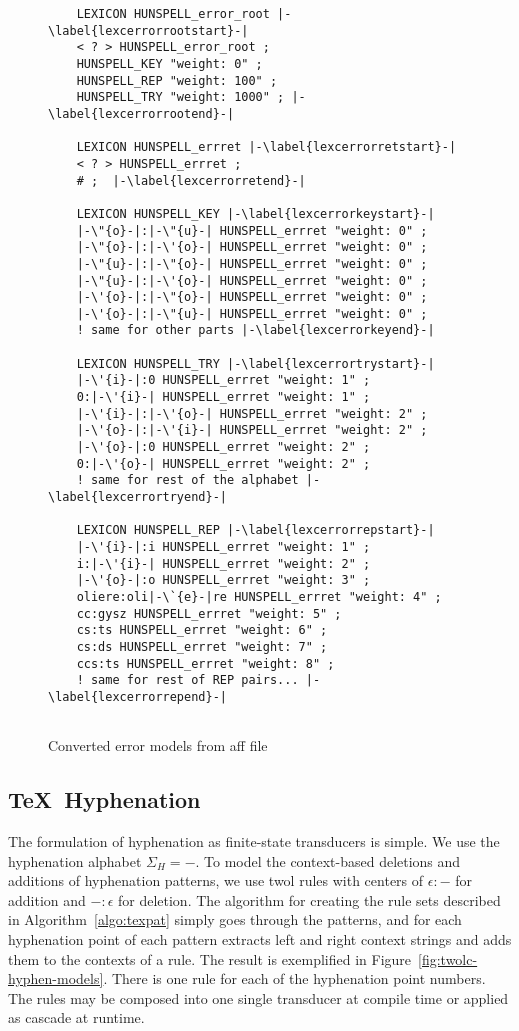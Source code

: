 \documentclass[postprint]{flammie}
\begin{document}
\begin{figure}[tbp]
  \centering
  \begin{lstlisting}
    LEXICON HUNSPELL_error_root |-\label{lexcerrorrootstart}-|
    < ? > HUNSPELL_error_root ; 
    HUNSPELL_KEY "weight: 0" ;
    HUNSPELL_REP "weight: 100" ;
    HUNSPELL_TRY "weight: 1000" ; |-\label{lexcerrorrootend}-|
    
    LEXICON HUNSPELL_errret |-\label{lexcerrorretstart}-|
    < ? > HUNSPELL_errret ; 
    # ;  |-\label{lexcerrorretend}-|
    
    LEXICON HUNSPELL_KEY |-\label{lexcerrorkeystart}-|
    |-\"{o}-|:|-\"{u}-| HUNSPELL_errret "weight: 0" ; 
    |-\"{o}-|:|-\'{o}-| HUNSPELL_errret "weight: 0" ;
    |-\"{u}-|:|-\"{o}-| HUNSPELL_errret "weight: 0" ;
    |-\"{u}-|:|-\'{o}-| HUNSPELL_errret "weight: 0" ;
    |-\'{o}-|:|-\"{o}-| HUNSPELL_errret "weight: 0" ;
    |-\'{o}-|:|-\"{u}-| HUNSPELL_errret "weight: 0" ; 
    ! same for other parts |-\label{lexcerrorkeyend}-|
    
    LEXICON HUNSPELL_TRY |-\label{lexcerrortrystart}-|
    |-\'{i}-|:0 HUNSPELL_errret "weight: 1" ;
    0:|-\'{i}-| HUNSPELL_errret "weight: 1" ;
    |-\'{i}-|:|-\'{o}-| HUNSPELL_errret "weight: 2" ;
    |-\'{o}-|:|-\'{i}-| HUNSPELL_errret "weight: 2" ;
    |-\'{o}-|:0 HUNSPELL_errret "weight: 2" ;
    0:|-\'{o}-| HUNSPELL_errret "weight: 2" ;
    ! same for rest of the alphabet |-\label{lexcerrortryend}-|
    
    LEXICON HUNSPELL_REP |-\label{lexcerrorrepstart}-|
    |-\'{i}-|:i HUNSPELL_errret "weight: 1" ;
    i:|-\'{i}-| HUNSPELL_errret "weight: 2" ;
    |-\'{o}-|:o HUNSPELL_errret "weight: 3" ;       
    oliere:oli|-\`{e}-|re HUNSPELL_errret "weight: 4" ; 
    cc:gysz HUNSPELL_errret "weight: 5" ;       
    cs:ts HUNSPELL_errret "weight: 6" ;       
    cs:ds HUNSPELL_errret "weight: 7" ;       
    ccs:ts HUNSPELL_errret "weight: 8" ;  
    ! same for rest of REP pairs... |-\label{lexcerrorrepend}-|
    
  \end{lstlisting}
  \caption{Converted error models from aff file}
  \label{fig:lexc-error-models}
\end{figure}

\subsection{\TeX\ Hyphenation}

The formulation of hyphenation as finite-state transducers is simple.  We use
the hyphenation alphabet $\Sigma_H = {-}$. To model the context-based deletions
and additions of hyphenation patterns, we use twol rules with centers of
$\epsilon:-$ for addition and $-:\epsilon$ for deletion. The algorithm for
creating the rule sets described in Algorithm~\ref{algo:texpat} simply goes
through the patterns, and for each hyphenation point of each pattern extracts
left and right context strings and adds them to the contexts of a rule. 
The result is exemplified in Figure~\ref{fig:twolc-hyphen-models}.
There is one rule for each of the hyphenation point numbers. The rules may be 
composed into one single transducer at compile time or applied as cascade at runtime.
\end{document}
